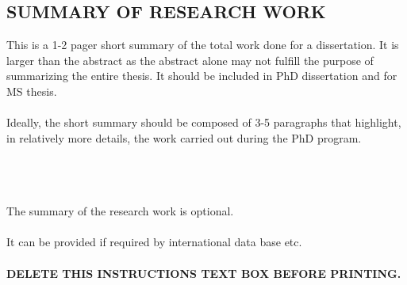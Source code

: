 \documentclass{article}
\begin{document}
\begin{justify}
\chapter{SUMMARY OF RESEARCH WORK}
 This is a 1-2 pager short summary of the total work done for a dissertation. It is larger than the abstract as the abstract alone may not fulfill the purpose of summarizing the entire thesis. It should be included in PhD dissertation and for MS thesis.\\~\\
Ideally, the short summary should be composed of 3-5 paragraphs that highlight, in relatively more details, the work carried out during the PhD program.\\~\\
\\~\\
\begin{tcolorbox}[enhanced jigsaw,
    sharp corners,
    boxrule=0.5pt, 
    colback=blue!30!white,   
    borderline={0.5pt}{-2pt}{black,solid} %
 ]
 \begin{justify}
The summary of the research work is optional.\\~\\
It can be provided if required by international data base etc.\\~\\
{\bf DELETE THIS INSTRUCTIONS TEXT BOX BEFORE PRINTING.}
 \end{justify}
\end{tcolorbox}

\end{justify}
\end{document}
